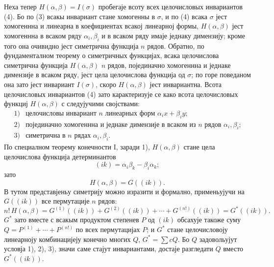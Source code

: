 ﻿\documentclass[11pt]{article}
\begin{document}
Неха тепер \(H(\alpha,\beta)=I(\sigma)\) пробегаје всоту всех целочисловых инвариантов (4). Бо по (3) всакы инвариант стане хомогенны в \(\sigma\), и по (4) всака \(\sigma\) јест хомогеннна и линеарна в коефициентах всакој линеарној формы, \(H(\alpha,\beta)\) јест хомогеннна в всаком ряду \(\alpha_i,\beta_i\) и в всаком ряду имаје једнаку димензију; кроме того она очивидно јест симетрична функција \(n\) рядов. Обратно, по фундаменталном теорему о симетричных функцијах, всака целочислова симетрична функција \(H(\alpha,\beta)\) \(n\) рядов, појединачно хомогеннна и једнаке димензије в всаком ряду, јест цела целочислова функција од \(\sigma\); по горе поведаном она зато јест инвариант \(I(\sigma)\), скоро \(H(\alpha,\beta)\) јест инвариантна. Всота целочисловых инвариантов (4) зато карактеризује се како всота целочисловых функциј \(H(\alpha,\beta)\) с следујучими својствами:
\[
\begin{array}{ll}
1) & \text{целочисловы инвариант \(n\) линеарных форм \(\alpha_i x+\beta_i y\);}\\
2) & \text{појединачно хомогеннна и једнаке димензије в всаком из \(n\) рядов \(\alpha_i,\beta_i\);}\\
3) & \text{симетрична в \(n\) рядах \(\alpha_i,\beta_i\).}
\end{array}
\]
По специалном теорему конечности I, заради 1), \(H(\alpha,\beta)\) стане цела целочислова функција детерминантов
\[
        (ik)=\alpha_i\beta_k-\beta_i\alpha_k;
\]
зато
\[
        H(\alpha,\beta)=G((ik)).
\]
В тутом представјеньу симетрију можно изразити и формално, применьујучи на \(G((ik))\) все пермутације \(n\) рядов:
\begin{equation}
        n!\,H(\alpha,\beta)
        =
        G^{(1)}((ik))+G^{(2)}((ik))+\cdots+G^{(n!)}((ik))
        =G^*((ik)).
\end{equation}
\(G^*\) зато вместе с всакым продуктом степенев \(P\) од \((ik)\) обсахује такоже суму \(Q=P^{(1)}+\cdots+P^{(n!)}\) по всех пермутацијах \(P\); и \(G^*\) стане целочисловоју линеарноју комбинацијеју конечно многих \(Q\), \(G^*=\sum cQ\). Бо \(Q\) задовольујут условја 1), 2), 3), значи саме стајут инвариантами, достаје разгледати \(Q\) вместо \(G^*((ik))\).
\end{document}
